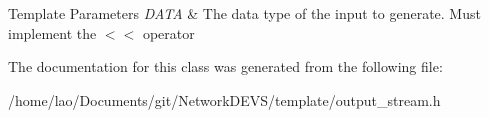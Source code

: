 \begin{DoxyTemplParams}{Template Parameters}
{\em D\+A\+TA} & The data type of the input to generate. Must implement the $<$$<$ operator \\
\hline
\end{DoxyTemplParams}


The documentation for this class was generated from the following file\+:\begin{DoxyCompactItemize}
\item 
/home/lao/\+Documents/git/\+Network\+D\+E\+V\+S/template/output\+\_\+stream.\+h\end{DoxyCompactItemize}
